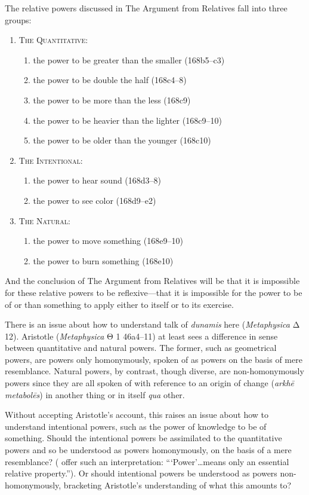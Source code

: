 The relative powers discussed in The Argument from Relatives fall into three groups:
\begin{enumerate}[(1)]
	\item \textsc{The Quantitative}:
	\begin{enumerate}
		\item the power to be greater than the smaller (168b5–c3)
		\item the power to be double the half (168c4–8)
		\item the power to be more than the less (168c9)
		\item the power to be heavier than the lighter (168c9–10)
		\item the power to be older than the younger (168c10)
	\end{enumerate}
	\item \textsc{The Intentional}:
	\begin{enumerate}
		\item the power to hear sound (168d3–8)
		\item the power to see color (168d9–e2)
	\end{enumerate}
	\item \textsc{The Natural}:
	\begin{enumerate}
		\item the power to move something (168e9–10)
		\item the power to burn something (168e10)
	\end{enumerate}
\end{enumerate}
And the conclusion of The Argument from Relatives will be that it is impossible for these relative powers to be reflexive—that it is impossible for the power to be of or than something to apply either to itself or to its exercise.

There is an issue about how to understand talk of \emph{dunamis} here (\emph{Metaphysica} {\sbl Δ} 12). Aristotle (\emph{Metaphysica} {\sbl Θ} 1 46a4–11) at least sees a difference in sense between quantitative and natural powers. The former, such as geometrical powers, are powers only homonymously, spoken of as powers on the basis of mere resemblance. Natural powers, by contrast, though diverse, are non-homonymously powers since they are all spoken of with reference to an origin of change (\emph{arkhē metabolēs}) in another thing or in itself \emph{qua} other. 

Without accepting Aristotle's account, this raises an issue about how to understand intentional powers, such as the power of knowledge to be of something. Should the intentional powers be assimilated to the quantitative powers and so be understood as powers homonymously, on the basis of a mere resemblance? (\citealt[24 n74]{Moore:2019aa} offer such an interpretation: ```Power'\ldots means only an essential relative property.''). Or should intentional powers be understood as powers non-homonymously, bracketing Aristotle's understanding of what this amounts to? 

